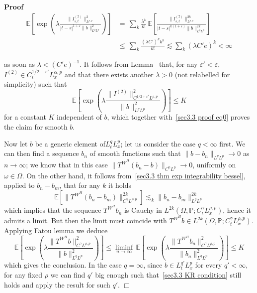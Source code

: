 \documentclass[10pt]{article}
\newcommand{\tmcolor}[2]{{\color{#1}{#2}}}
\newenvironment{proof}{\noindent\textbf{Proof\ }}{\hspace*{\fill}$\Box$\medskip}
\begin{document}
\begin{proof}
  \begin{align}
    \mathbb{E} \left[ \exp \left( \lambda \frac{\| I^{(2)}_{s, t} \|_{L^{\rho,
    p}}^2}{| t - s |^{1 + \varepsilon} \| b \|^2_{L^q L^p}} \right) \right] &
    = \, \sum_k \frac{\lambda^k}{k!} \, \mathbb{E} \left[ \frac{\| I^{(2)}_{s,
    t} \|_{L^{\rho, p}}^{2 k}}{| t - s |^{k (1 + \varepsilon)} \| b \|^{2
    k}_{L^q L^p}} \right]\\
    & \leqslant \, \sum_k \frac{(\lambda C')^k k^k}{k!} \lesssim \sum_k
    (\lambda C' e)^k < \infty
  \end{align}
  
  as soon as $\lambda < (C' e)^{- 1}$. It follows from
  Lemma~\tmcolor{blue}{\tmcolor{black}{\ref{appendixA1 chaining lemma}}} that,
  for any $\varepsilon' < \varepsilon$, $I^{(2)} \in C_t^{1 / 2 +
  \varepsilon'} L_x^{\alpha, p}$ and that there exists another $\lambda > 0$
  (not relabelled for simplicity) such that
  \begin{equation}
    \mathbb{E} \left[ \exp \left( \lambda \frac{\| I^{(2)} \|^2_{C^{1 / 2 +
    \varepsilon'} L^{\rho, p}}}{\| b \|^2_{L^q L^p}} \right) \right] \leqslant
    K \label{sec3.3 proof eq2}
  \end{equation}
  for a constant $K$ independent of $b$, which together with~{\eqref{sec3.3
  proof eq0}} proves the claim for smooth $b$.
  
  Now let $b$ be a generic element of$L^q_t L^p_x$; let us consider the case
  $q < \infty$ first. We can then find a sequence $b_n$ of smooth functions
  such that $\| b - b_n \|_{L^q L^p} \rightarrow 0$ as $n \rightarrow \infty$;
  we know that in this case $\| T^{W^H} (b_n - b) \|_{C^0 L^p} \rightarrow 0$,
  uniformly on $\omega \in \Omega$. On the other hand, it follows
  from~{\eqref{sec3.3 thm exp integrability bessel}}, applied to $b_n - b_m$,
  that for any $k$ it holds
  \[ \mathbb{E} [\| T^{W^H} (b_n - b_m) \|^{2 k}_{C^{\gamma} L^{\rho, p}}]
     \lesssim_k \| b_n - b_m \|^{2 k}_{L^q L^p} \]
  which implies that the sequence $T^{W^H} b_n$ is Cauchy in $L^{2 k} (\Omega,
  \mathbb{P}; C_t^{\gamma} L_x^{\rho, p})$, hence it admits a limit. But then
  the limit must coincide with $T^{W^H} b \in L^{2 k} (\Omega, \mathbb{P};
  C_t^{\gamma} L_x^{\rho, p})$. Applying Fatou lemma we deduce
  \[ \mathbb{E} \left[ \exp \left( \lambda \frac{\| T^{W^H} b \|^2_{C^{\gamma}
     L^{\rho, p}}}{\| b \|_{L^q L^p}^2} \right) \right] \leqslant \liminf_{n
     \rightarrow \infty} \, \mathbb{E} \left[ \exp \left( \lambda \frac{\|
     T^{W^H} b_n \|^2_{C^{\gamma} L^{\rho, p}}}{\| b_n \|_{L^q L^p}^2} \right)
     \right] \leqslant K \]
  which gives the conclusion. In the case $q = \infty$, since $b \in L^{q'}_t
  L^p_x$ for every $q' < \infty$, for any fixed $\rho$ we can find $q'$ big
  enough such that~{\eqref{sec3.3 KR condition}} still holds and apply the
  result for such $q'$.
\end{proof}
\end{document}
